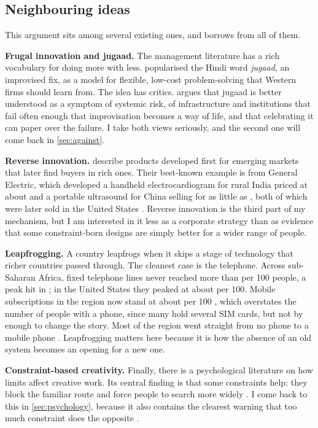 \subsection{Neighbouring ideas}

This argument sits among several existing ones, and borrows from all of them.

\textbf{Frugal innovation and jugaad.} The management literature has a rich
vocabulary for doing more with less. \textcite{radjou2012} popularised the
Hindi word \emph{jugaad}, an improvised fix, as a model for flexible,
low-cost problem-solving that Western firms should learn from. The idea has
critics. \textcite{birtchnell2011} argues that jugaad is better understood as a
symptom of systemic risk, of infrastructure and institutions that fail often
enough that improvisation becomes a way of life, and that celebrating it can
paper over the failure. I take both views seriously, and the second one will
come back in \cref{sec:against}.

\textbf{Reverse innovation.} \textcite{govindarajan2012} describe products
developed first for emerging markets that later find buyers in rich ones. Their
best-known example is from General Electric, which developed a handheld
electrocardiogram for rural India priced at about \geEcgPrice{} and a
portable ultrasound for China selling for as little as \geUltrasoundPrice{},
both of which were later sold in the United States
\parencite{immelt2009}. Reverse innovation is the third part of my mechanism,
but I am interested in it less as a corporate strategy than as evidence that
some constraint-born designs are simply better for a wider range of people.

\textbf{Leapfrogging.} A country leapfrogs when it skips a stage of technology
that richer countries passed through. The cleanest case is the telephone.
Across sub-Saharan Africa, fixed telephone lines never reached more than
\sspFixedPeak{} per 100 people, a peak hit in \sspFixedPeakYear{}; in the
United States they peaked at about \usaFixedPeak{} per 100. Mobile
subscriptions in the region now stand at about \sspMobileSubs{} per 100
\parencite{worldbank_wdi}, which overstates the number of people with a phone,
since many hold several SIM cards, but not by enough to change the story. Most
of the region went straight from no phone to a mobile phone
\parencite{aker2010}. Leapfrogging matters here because it is how the absence
of an old system becomes an opening for a new one.

\textbf{Constraint-based creativity.} Finally, there is a psychological
literature on how limits affect creative work. Its central finding is that
some constraints help: they block the familiar route and force people to
search more widely \parencite{stokes2006,moreau2005,mehta2016}. I come back to
this in \cref{sec:psychology}, because it also contains the clearest warning
that too much constraint does the opposite \parencite{acar2019}.

